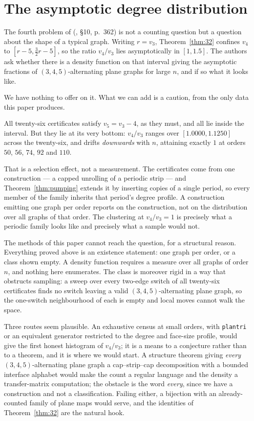 \documentclass[11pt,a4paper]{amsart}
\theoremstyle{plain}
\theoremstyle{definition}
\begin{document}
\section{The asymptotic degree distribution}\label{sec:density}

The fourth problem of (\cite{AHSSV2015}, \S10, p.~362) is not a counting
question but a question about the shape of a typical graph. Writing $r = v_3$,
Theorem~\ref{thm:32} confines $v_4$ to $[r-5, \tfrac32 r - 5]$, so the ratio
$v_4/v_3$ lies asymptotically in $[1, 1.5]$. The authors ask whether there is a
density function on that interval giving the asymptotic fractions of
$(3,4,5)$-alternating plane graphs for large $n$, and if so what it looks like.

We have nothing to offer on it. What we can add is a caution, from the only
data this paper produces.

All twenty-six certificates satisfy $v_5 = v_3 - 4$, as they must, and all lie
inside the interval. But they lie at its very bottom: $v_4/v_3$ ranges over
$[1.0000, 1.1250]$ across the twenty-six, and drifts \emph{downwards} with $n$,
attaining exactly $1$ at orders $50$, $56$, $74$, $92$ and $110$.

That is a selection effect, not a measurement. The certificates come from one
construction --- a capped unrolling of a periodic strip --- and
Theorem~\ref{thm:pumping} extends it by inserting copies of a single period, so
every member of the family inherits that period's degree profile. A construction
emitting one graph per order reports on the construction, not on the
distribution over all graphs of that order. The clustering at $v_4/v_3 = 1$ is
precisely what a periodic family looks like and precisely what a sample would
not.

The methods of this paper cannot reach the question, for a structural reason.
Everything proved above is an existence statement: one graph per order, or a
class shown empty. A density function requires a measure over all graphs of
order $n$, and nothing here enumerates. The class is moreover rigid in a way
that obstructs sampling: a sweep over every two-edge switch of all twenty-six
certificates finds no switch leaving a valid $(3,4,5)$-alternating plane graph,
so the one-switch neighbourhood of each is empty and local moves cannot walk the
space.

Three routes seem plausible. An exhaustive census at small orders, with
\texttt{plantri}~\cite{plantri} or an equivalent generator restricted to the degree and
face-size profile, would give the first honest histogram of $v_4/v_3$; it is a
means to a conjecture rather than to a theorem, and it is where we would start.
A structure theorem giving \emph{every} $(3,4,5)$-alternating plane graph a
cap--strip--cap decomposition with a bounded interface alphabet would make the
count a regular language and the density a transfer-matrix computation; the
obstacle is the word \emph{every}, since we have a construction and not a
classification. Failing either, a bijection with an already-counted family of
plane maps would serve, and the identities of Theorem~\ref{thm:32} are the
natural hook.
\end{document}
